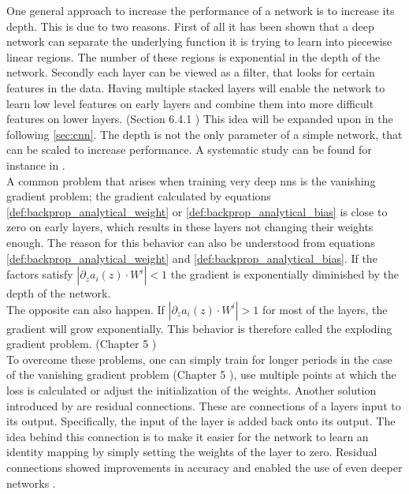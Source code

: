 One general approach to increase the performance of a network is to increase its depth. This is due to two reasons. First of all it has been shown that a deep network can separate the underlying function it is trying to learn into piecewise linear regions. The number of these regions is exponential in the depth of the network. Secondly each layer can be viewed as a filter, that looks for certain features in the data. Having multiple stacked layers will enable the network to learn low level features on early layers and combine them into more difficult features on lower layers. (Section 6.4.1 \cite{deep_learning_book}) This idea will be expanded upon in the following \autoref{sec:cnn}. The depth is not the only parameter of a simple network, that can be scaled to increase performance. A systematic study can be found for instance in \cite{efficient_net}.\\
A common problem that arises when training very deep \gls{nns} is the vanishing gradient problem; the gradient calculated by equations \eqref{def:backprop_analytical_weight} or \eqref{def:backprop_analytical_bias} is close to zero on early layers, which results in these layers not changing their weights enough. The reason for this behavior can also be understood from equations \eqref{def:backprop_analytical_weight} and \eqref{def:backprop_analytical_bias}. If the factors satisfy $\left|\partial_z a_i(z)\cdot W^i\right|<1$ the gradient is exponentially diminished by the depth of the network.\\
The opposite can also happen. If $\left|\partial_z a_i(z)\cdot W^i\right|>1$ for most of the layers, the gradient will grow exponentially. This behavior is therefore called the exploding gradient problem. (Chapter 5 \cite{deep_learning_beginning})\\
To overcome these problems, one can simply train for longer periods in the case of the vanishing gradient problem (Chapter 5 \cite{deep_learning_beginning}), use multiple points at which the loss is calculated \cite{inception_module} or adjust the initialization of the weights. Another solution introduced by \cite{residual_connections_invention} are residual connections. These are connections of a layers input to its output. Specifically, the input of the layer is added back onto its output. The idea behind this connection is to make it easier for the network to learn an identity mapping by simply setting the weights of the layer to zero. Residual connections showed improvements in accuracy and enabled the use of even deeper networks \cite{residual_connections_invention}.
